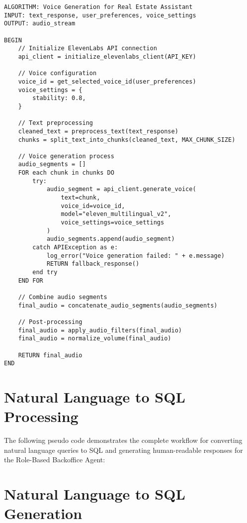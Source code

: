 \begin{verbatim}
ALGORITHM: Voice Generation for Real Estate Assistant
INPUT: text_response, user_preferences, voice_settings
OUTPUT: audio_stream

BEGIN
    // Initialize ElevenLabs API connection
    api_client = initialize_elevenlabs_client(API_KEY)
    
    // Voice configuration
    voice_id = get_selected_voice_id(user_preferences)
    voice_settings = {
        stability: 0.8,
    }
    
    // Text preprocessing
    cleaned_text = preprocess_text(text_response)
    chunks = split_text_into_chunks(cleaned_text, MAX_CHUNK_SIZE)
    
    // Voice generation process
    audio_segments = []
    FOR each chunk in chunks DO
        try:
            audio_segment = api_client.generate_voice(
                text=chunk,
                voice_id=voice_id,
                model="eleven_multilingual_v2",
                voice_settings=voice_settings
            )
            audio_segments.append(audio_segment)
        catch APIException as e:
            log_error("Voice generation failed: " + e.message)
            RETURN fallback_response()
        end try
    END FOR
    
    // Combine audio segments
    final_audio = concatenate_audio_segments(audio_segments)
    
    // Post-processing
    final_audio = apply_audio_filters(final_audio)
    final_audio = normalize_volume(final_audio)
    
    RETURN final_audio
END
\end{verbatim}

\section{Natural Language to SQL Processing}
\label{app:C}

The following pseudo code demonstrates the complete workflow for converting natural language queries to SQL and generating human-readable responses for the Role-Based Backoffice Agent:

\section*{Natural Language to SQL Generation}

